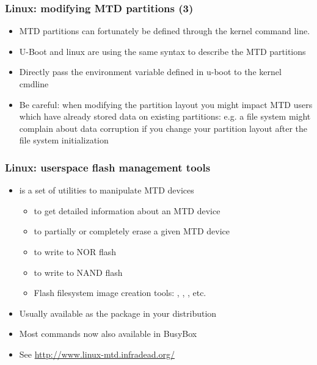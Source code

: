 \begin{frame}[fragile]
  \frametitle{Linux: modifying MTD partitions (3)}
  \begin{itemize}
  \item MTD partitions can fortunately be defined through the kernel
    command line.
  \item U-Boot and linux are using the same syntax to describe the MTD
    partitions
  \item Directly pass the  environment variable defined in
    u-boot to the kernel cmdline
  \item Be careful: when modifying the partition layout you might impact
    MTD users which have already stored data on existing partitions: e.g.
    a file system might complain about data corruption if you change
    your partition layout after the file system initialization
\end{itemize}
\end{frame}

\begin{frame}
  \frametitle{Linux: userspace flash management tools}
  \begin{itemize}
  \item {} is a set of utilities to manipulate MTD devices
    \begin{itemize}
    \item {} to get detailed information about an MTD device
    \item {} to partially or completely erase a given
      MTD device
    \item {} to write to NOR flash
    \item {} to write to NAND flash
    \item Flash filesystem image creation tools: ,
      , , etc.
    \end{itemize}
  \item Usually available as the  package in your distribution
  \item Most commands now also available in BusyBox
  \item See \url{http://www.linux-mtd.infradead.org/}
  \end{itemize}
\end{frame}


